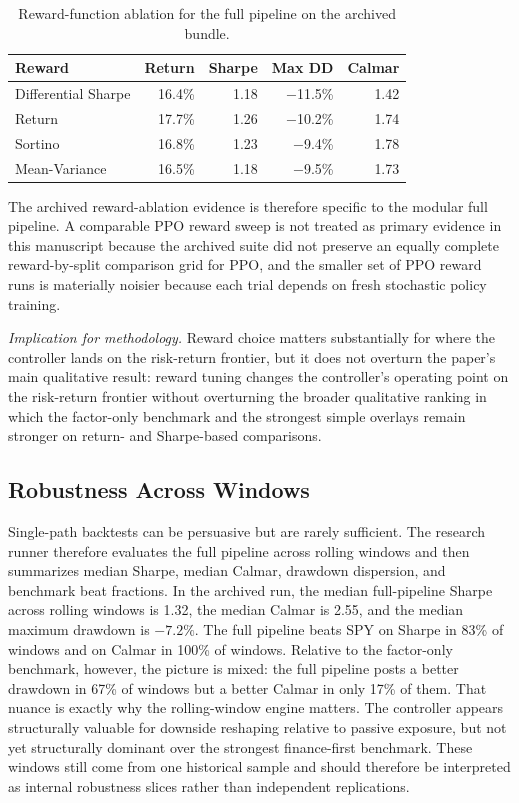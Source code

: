 \documentclass[11pt]{article}
\begin{document}
\begin{table}[H]
\centering
\caption{Reward-function ablation for the full pipeline on the archived bundle.}
\label{tab:reward_ablation}
\begin{tabular}{@{} l r r r r @{}}
\toprule
\textbf{Reward} & \textbf{Return} & \textbf{Sharpe} & \textbf{Max DD} & \textbf{Calmar} \\
\midrule
Differential Sharpe & 16.4\% & 1.18 & $-$11.5\% & 1.42 \\
Return              & 17.7\% & 1.26 & $-$10.2\% & 1.74 \\
Sortino             & 16.8\% & 1.23 & $-$9.4\%  & 1.78 \\
Mean-Variance       & 16.5\% & 1.18 & $-$9.5\%  & 1.73 \\
\bottomrule
\end{tabular}
\end{table}

The archived reward-ablation evidence is therefore specific to the modular full
pipeline. A comparable PPO reward sweep is not treated as primary evidence in
this manuscript because the archived suite did not preserve an equally complete
reward-by-split comparison grid for PPO, and the smaller set of PPO reward runs
is materially noisier because each trial depends on fresh stochastic policy
training.

\noindent\textit{Implication for methodology.} Reward choice matters
substantially for where the controller lands on the risk-return frontier, but it
does not overturn the paper's main qualitative result: reward tuning changes the
controller's operating point on the risk-return frontier without overturning the
broader qualitative ranking in which the factor-only benchmark and the strongest
simple overlays remain stronger on return- and Sharpe-based comparisons.

\subsection{Robustness Across Windows}

Single-path backtests can be persuasive but are rarely sufficient. The research
runner therefore evaluates the full pipeline across rolling windows and then
summarizes median Sharpe, median Calmar, drawdown dispersion, and benchmark beat
fractions. In the archived run, the median full-pipeline Sharpe across rolling
windows is 1.32, the median Calmar is 2.55, and the median maximum drawdown is
$-7.2\%$. The full pipeline beats SPY on Sharpe in 83\% of windows and on
Calmar in 100\% of windows. Relative to the factor-only benchmark, however, the
picture is mixed: the full pipeline posts a better drawdown in 67\% of windows
but a better Calmar in only 17\% of them. That nuance is exactly why the
rolling-window engine matters. The controller appears structurally valuable for
downside reshaping relative to passive exposure, but not yet structurally
dominant over the strongest finance-first benchmark.
These windows still come from one historical sample and should therefore be
interpreted as internal robustness slices rather than independent replications.
\end{document}
